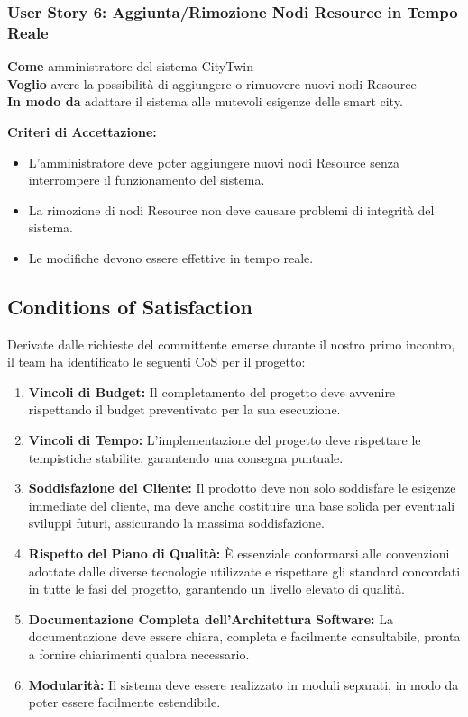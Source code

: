 \subsubsection{User Story 6: Aggiunta/Rimozione Nodi Resource in Tempo Reale}

\textbf{Come} amministratore del sistema CityTwin \\
\textbf{Voglio} avere la possibilità di aggiungere o rimuovere nuovi nodi Resource \\
\textbf{In modo da} adattare il sistema alle mutevoli esigenze delle smart city.

\textbf{Criteri di Accettazione:}
\begin{itemize}
    \item L'amministratore deve poter aggiungere nuovi nodi Resource senza interrompere il funzionamento del sistema.
    \item La rimozione di nodi Resource non deve causare problemi di integrità del sistema.
    \item Le modifiche devono essere effettive in tempo reale.
\end{itemize}

\subsection{Conditions of Satisfaction}

Derivate dalle richieste del committente emerse durante il nostro primo incontro, il team ha identificato le seguenti CoS per il progetto:

\begin{enumerate}
    \item \textbf{Vincoli di Budget:} Il completamento del progetto deve avvenire rispettando il budget preventivato per la sua esecuzione.

    \item \textbf{Vincoli di Tempo:} L'implementazione del progetto deve rispettare le tempistiche stabilite, garantendo una consegna puntuale.

    \item \textbf{Soddisfazione del Cliente:} Il prodotto deve non solo soddisfare le esigenze immediate del cliente, ma deve anche costituire una base solida per eventuali sviluppi futuri, assicurando la massima soddisfazione.

    \item \textbf{Rispetto del Piano di Qualità:} È essenziale conformarsi alle convenzioni adottate dalle diverse tecnologie utilizzate e rispettare gli standard concordati in tutte le fasi del progetto, garantendo un livello elevato di qualità.

    \item \textbf{Documentazione Completa dell'Architettura Software:} La documentazione deve essere chiara, completa e facilmente consultabile, pronta a fornire chiarimenti qualora necessario.

    \item \textbf{Modularità:} Il sistema deve essere realizzato in moduli separati, in modo da poter essere facilmente estendibile.

\end{enumerate}


